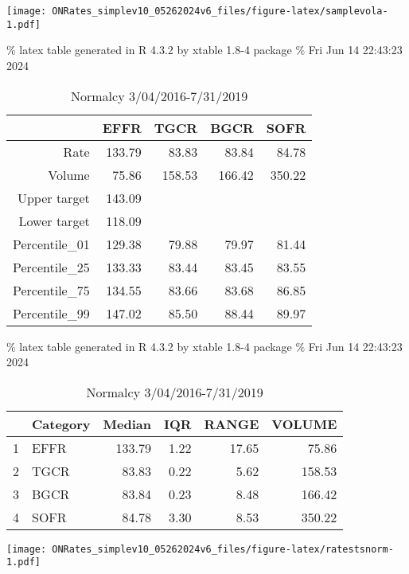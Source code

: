 \documentclass[
]{article}
\let\origfigure\figure
\let\endorigfigure\endfigure
\renewenvironment{figure}[1][2] {
    \expandafter\origfigure\expandafter[H]
} {
    \endorigfigure
}
\begin{document}
\begin{figure}
\centering
\texttt{[image: ONRates\_simplev10\_05262024v6\_files/figure-latex/samplevola-1.pdf]}
\caption{\label{fig:samplevola}Volatility percent change daily rates 2016-2023}
\end{figure}

\% latex table generated in R 4.3.2 by xtable 1.8-4 package
\% Fri Jun 14 22:43:23 2024

\begin{table}[ht]
\centering
\begin{tabular}{rrrrr}
  \hline
 & EFFR & TGCR & BGCR & SOFR \\ 
  \hline
Rate & 133.79 & 83.83 & 83.84 & 84.78 \\ 
  Volume & 75.86 & 158.53 & 166.42 & 350.22 \\ 
  Upper target & 143.09 &  &  &  \\ 
  Lower target & 118.09 &  &  &  \\ 
  Percentile\_01 & 129.38 & 79.88 & 79.97 & 81.44 \\ 
  Percentile\_25 & 133.33 & 83.44 & 83.45 & 83.55 \\ 
  Percentile\_75 & 134.55 & 83.66 & 83.68 & 86.85 \\ 
  Percentile\_99 & 147.02 & 85.50 & 88.44 & 89.97 \\ 
   \hline
\end{tabular}
\caption{Normalcy 3/04/2016-7/31/2019} 
\end{table}

\% latex table generated in R 4.3.2 by xtable 1.8-4 package
\% Fri Jun 14 22:43:23 2024

\begin{table}[ht]
\centering
\begin{tabular}{rlrrrr}
  \hline
 & Category & Median & IQR & RANGE & VOLUME \\ 
  \hline
1 & EFFR & 133.79 & 1.22 & 17.65 & 75.86 \\ 
  2 & TGCR & 83.83 & 0.22 & 5.62 & 158.53 \\ 
  3 & BGCR & 83.84 & 0.23 & 8.48 & 166.42 \\ 
  4 & SOFR & 84.78 & 3.30 & 8.53 & 350.22 \\ 
   \hline
\end{tabular}
\caption{Normalcy 3/04/2016-7/31/2019} 
\end{table}

\begin{figure}
\centering
\texttt{[image: ONRates\_simplev10\_05262024v6\_files/figure-latex/ratestsnorm-1.pdf]}
\caption{\label{fig:ratestsnorm}Rates during normalcy period 3/4/2016-7/31/2019}
\end{figure}
\end{document}
